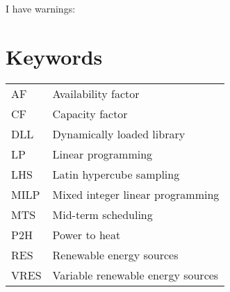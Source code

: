 I have  warnings:
\begin{itemize}
    \mylistwarnings{\item}
\end{itemize}

\newpage

\section*{Keywords}


\begin{table}[h!]
    \begin{tabular}{p{3cm} p{8cm}}
        AF & Availability factor \\
        CF & Capacity factor \\
        DLL & Dynamically loaded library \\
        LP & Linear programming \\
        LHS & Latin hypercube sampling \\
        MILP & Mixed integer linear programming \\
        MTS & Mid-term scheduling \\
        P2H & Power to heat \\
        RES & Renewable energy sources \\
        VRES & Variable renewable energy sources \\
    \end{tabular}
\end{table}

\newpage
